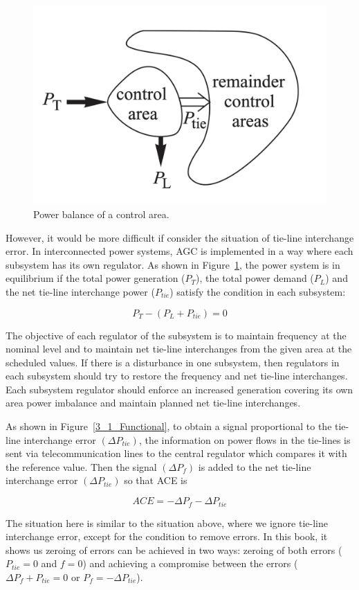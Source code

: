 \begin{figure}[t]
\center
\includegraphics[scale=0.27]{figure/3_1_Power.png}
\caption{Power balance of a control area.}
\label{3_1_Power}
\end{figure}

However, it would be more difficult if consider the situation of tie-line interchange error. In interconnected power systems, AGC is implemented in a way where each subsystem has its own regulator. As shown in Figure~\ref{3_1_Power}, the power system is in equilibrium if the total power generation ($P_T$), the total power demand ($P_L$) and the net tie-line interchange power ($P_{t i e}$) satisfy the condition in each subsystem: 

\begin{equation} \label{eq1}
P_T - (P_L + P_{t i e}) = 0
\end{equation}

The objective of each regulator of the subsystem is to maintain frequency at the nominal level and to maintain net tie-line interchanges from the given area at the scheduled values. If there is a disturbance in one subsystem, then regulators in each subsystem should try to restore the frequency and net tie-line interchanges. Each subsystem regulator should enforce an increased generation covering its own area power imbalance and maintain planned net tie-line interchanges.

As shown in Figure~\ref{3_1_Functional}, to obtain a signal proportional to the tie-line interchange error $(\Delta P_{tie})$, the information on power flows in the tie-lines is sent via telecommunication lines to the central regulator which compares it with the reference value. Then the signal $(\Delta P_f)$ is added to the net tie-line interchange error $(\Delta P_{tie})$ so that ACE is


\begin{equation} \label{eq2}
ACE = - \Delta P_f - \Delta P_{tie}
\end{equation}


The situation here is similar to the situation above, where we ignore tie-line interchange error, except for the condition to remove errors. In this book, it shows us zeroing of errors can be achieved in two ways: zeroing of both errors ($ P_{tie} = 0 $ and $ f = 0 $) and achieving a compromise between the errors ($\Delta P_f + P_{tie} = 0$ or $P_f = - \Delta P_{tie}$). 